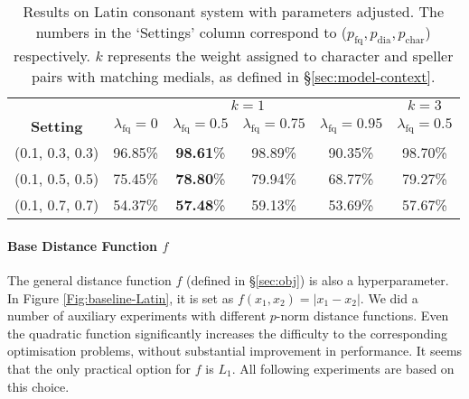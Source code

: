 \begin{table*}[thbp]
  \centering
    \begin{tabular}{cccccc}
    \toprule
     & \multicolumn{4}{c}{$k=1$}&\multicolumn{1}{c}{$k=3$}\\
    \cmidrule(lr){2-5} \cmidrule(lr){6-6} 
    \multicolumn{1}{c}{\textbf{Setting}} & $\lambda_{\text{fq}}=0$ & $\lambda_{\text{fq}}=0.5$ & $\lambda_{\text{fq}}=0.75$ & $\lambda_{\text{fq}}=0.95$ & \multicolumn{1}{l}{$\lambda_{\text{fq}}=0.5$} \\
    \midrule
    (0.1, 0.3, 0.3) &  96.85\%&  \textbf{98.61}\%& 98.89\% & 90.35\% & 98.70\% \\
    (0.1, 0.5, 0.5) & 75.45\% & \textbf{78.80}\% & 79.94\% & 68.77\% & 79.27\% \\
    (0.1, 0.7, 0.7) & 54.37\% & \textbf{57.48}\%& 59.13\% & 53.69\% & 57.67\% \\
    \bottomrule
    \end{tabular}%
    \caption{\label{tab:synthesis-adjust-parameters}Results on Latin consonant system with parameters adjusted. 
    The numbers in the `Settings' column correspond to ($p_{\text{fq}}, p_{\text{dia}}, p_{\text{char}}$) respectively. 
    $k$ represents the weight assigned to character and speller pairs with matching medials, as defined in \S\ref{sec:model-context}.} 
\end{table*}

\paragraph{Base Distance Function $f$} \label{form-of-function}
The general distance function $f$ (defined in \S\ref{sec:obj}) is also a hyperparameter. 
In Figure \ref{Fig:baseline-Latin}, it is set as $f(x_1,x_2)=|x_1-x_2|$. 
We did a number of auxiliary experiments with different $p$-norm distance functions. 
Even the quadratic function significantly increases the difficulty to the corresponding optimisation problems, without substantial improvement in performance. 
It seems that the only practical option for $f$ is $L_1$.
All following experiments are based on this choice.
%



